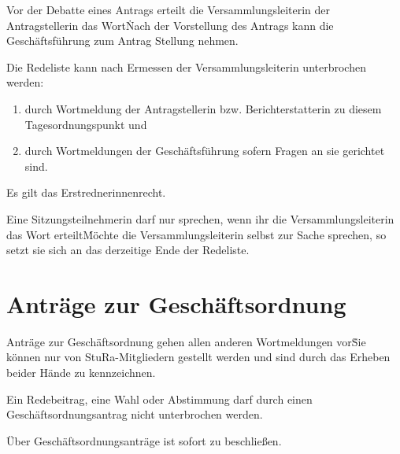 \begin{multicols}{2}
\Abs \Satz Vor der Debatte eines Antrags erteilt die Versammlungsleiterin der Antragstellerin das Wort\. Nach der Vorstellung des Antrags kann die Geschäftsführung zum Antrag Stellung nehmen.

\Abs \Satz Die Redeliste kann nach Ermessen der Versammlungsleiterin unterbrochen werden:
\begin{enumerate}
\item durch Wortmeldung der Antragstellerin bzw. Berichterstatterin zu diesem Tagesordnungspunkt und
\item durch Wortmeldungen der Geschäftsführung sofern Fragen an sie gerichtet sind.
\end{enumerate}

\Abs \Satz Es gilt das Erstrednerinnenrecht.

\Abs \Satz Eine Sitzungsteilnehmerin darf nur sprechen, wenn ihr die Versammlungsleiterin das Wort erteilt\. Möchte die Versammlungsleiterin selbst zur Sache sprechen, so setzt sie sich an das derzeitige Ende der Redeliste.



\section{Anträge zur Geschäftsordnung}

\Abs \Satz Anträge zur Geschäftsordnung gehen allen anderen Wortmeldungen vor\. Sie können nur von StuRa-Mitgliedern gestellt werden und sind durch das Erheben beider Hände zu kennzeichnen.

\Abs \Satz Ein Redebeitrag, eine Wahl oder Abstimmung darf durch einen Geschäftsordnungsantrag nicht unterbrochen werden.

\Abs \Satz Über Geschäftsordnungsanträge ist sofort zu beschließen.


\end{multicols}

